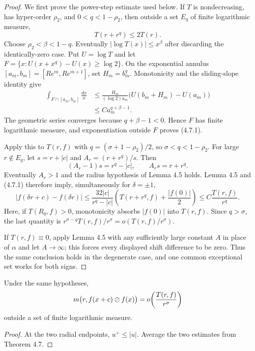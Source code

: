\begin{proof}
\leanok
We first prove the power-step estimate used below.  If $T$ is nondecreasing,
has hyper-order $\rho_2$, and $0<q<1-\rho_2$, then outside a set $E_q$ of
finite logarithmic measure,
\[
                         T(r+r^q)\leq2T(r).                       \tag{4.7.1}
\]
Choose $\rho_2<\beta<1-q$.  Eventually $|\log T(x)|\leq x^\beta$ after
discarding the identically-zero case.  Put $U=\log T$ and let
$F=\{x:U(x+x^q)-U(x)\geq\log2\}$.  On the exponential annulus
$[a_m,b_m]=[Re^m,Re^{m+1}]$, set $H_m=b_m^q$.  Monotonicity and the
sliding-slope identity give
\begin{align*}
 \int_{F\cap[a_m,b_m]}\frac{dx}{x}
 &\leq\frac{H_m}{(\log2)a_m}
       \bigl(U(b_m+H_m)-U(a_m)\bigr)\\
 &\leq C a_m^{q+\beta-1}.
\end{align*}
The geometric series converges because $q+\beta-1<0$.  Hence $F$ has finite
logarithmic measure, and exponentiation outside $F$ proves (4.7.1).

Apply this to $T(r,f)$ with
$q=(\sigma+1-\rho_2)/2$, so $\sigma<q<1-\rho_2$.  For large
$r\notin E_q$, let $s=r+|c|$ and $A_r=(r+r^q)/s$.  Then
\[
 (A_r-1)s=r^q-|c|,\qquad A_rs=r+r^q.
\]
Eventually $A_r>1$ and the radius hypothesis of Lemma 4.5 holds.  Lemma 4.5
and (4.7.1) therefore imply, simultaneously for $\delta=\pm1$,
\[
 |f(\delta r+c)-f(\delta r)|
 \leq\frac{32|c|}{r^q-|c|}
 \left(T(r+r^q,f)+\frac{|f(0)|}{2}\right)
 \leq C\frac{T(r,f)}{r^q}.
\]
Here, if $T(R_0,f)>0$, monotonicity absorbs $|f(0)|$ into $T(r,f)$.
Since $q>\sigma$, the last quantity is
$r^{\sigma-q}T(r,f)/r^\sigma=o(T(r,f)/r^\sigma)$.

If $T(r,f)\equiv0$, apply Lemma 4.5 with any sufficiently large constant
$A$ in place of $\alpha$ and let $A\to\infty$; this forces every displayed
shift difference to be zero.  Thus the same conclusion holds in the
degenerate case, and one common exceptional set works for both signs.
\end{proof}

\begin{corollary}
\leanok
{}
Under the same hypotheses,
\[
 m\bigl(r,f(x+c)\mathbin{\oslash} f(x)\bigr)
 =o\!\left(\frac{T(r,f)}{r^\sigma}\right)
\]
outside a set of finite logarithmic measure.
\end{corollary}

\begin{proof}
\leanok
At the two radial endpoints, $u^+\leq|u|$.  Average the two estimates from
Theorem 4.7.
\end{proof}

